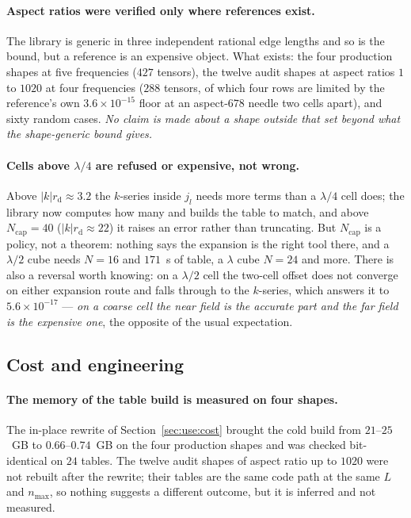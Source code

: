 \paragraph{Aspect ratios were verified only where references exist.} The library is generic
in three independent rational edge lengths and so is the bound, but a reference is an
expensive object. What exists: the four production shapes at five frequencies ($427$
tensors), the twelve audit shapes at aspect ratios $1$ to $1020$ at four frequencies
($288$ tensors, of which four rows are limited by the reference's own $3.6\times10^{-15}$
floor at an aspect-$678$ needle two cells apart), and sixty random cases. \emph{No claim is
made about a shape outside that set beyond what the shape-generic bound gives.}

\paragraph{Cells above $\lambda/4$ are refused or expensive, not wrong.} Above
$|k|r_{\mathrm{d}} \approx 3.2$ the $k$-series inside $j_l$ needs more terms than a
$\lambda/4$ cell does; the library now computes how many and builds the table to match, and
above $N_{\mathrm{cap}} = 40$ ($|k|r_{\mathrm{d}} \approx 22$) it raises an error rather than
truncating. But $N_{\mathrm{cap}}$ is a policy, not a theorem: nothing says the expansion is
the right tool there, and a $\lambda/2$ cube needs $N = 16$ and $171$~s of table, a
$\lambda$ cube $N = 24$ and more. There is also a reversal worth knowing: on a $\lambda/2$
cell the two-cell offset does not converge on either expansion route and falls through to
the $k$-series, which answers it to $5.6\times10^{-17}$ --- \emph{on a coarse cell the near
field is the accurate part and the far field is the expensive one}, the opposite of the
usual expectation.

\subsection{Cost and engineering}

\paragraph{The memory of the table build is measured on four shapes.} The in-place
rewrite of Section~\ref{sec:use:cost} brought the cold build from $21$--$25$~GB to
$0.66$--$0.74$~GB on the four production shapes and was checked bit-identical on $24$
tables. The twelve audit shapes of aspect ratio up to $1020$ were not rebuilt after the
rewrite; their tables are the same code path at the same $L$ and $n_{\max}$, so nothing
suggests a different outcome, but it is inferred and not measured.

